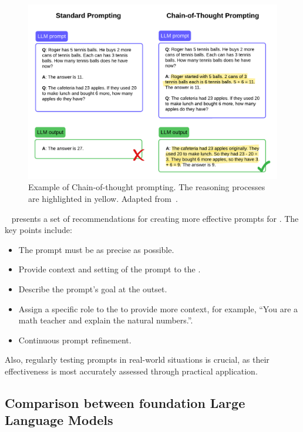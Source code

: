 \begin{figure}[ht]
    \includegraphics[width=14cm]{figs/chapter2/CoT.png}
    \centering
    \caption[Example of Chain-of-thought prompting]{Example of Chain-of-thought prompting. The reasoning processes are highlighted in yellow. Adapted from~\citet{wei_chain--thought_2023}.}
    \label{fig_cot}
\end{figure}


~\citet{mesko_prompt_2023} presents a set of recommendations for creating more effective prompts for {\llm}. The key points include:

\begin{itemize}
    \item The prompt must be as precise as possible.
    \item Provide context and setting of the prompt to the {\llm}.
    \item Describe the prompt's goal at the outset.
    \item Assign a specific role to the {\llm} to provide more context, for example, ``You are a math teacher and explain the natural numbers.''.
    \item Continuous {\llm} prompt refinement.
\end{itemize}

Also, regularly testing prompts in real-world situations
is crucial, as their effectiveness is most accurately assessed through practical application.



\subsection{Comparison between foundation Large Language Models}

